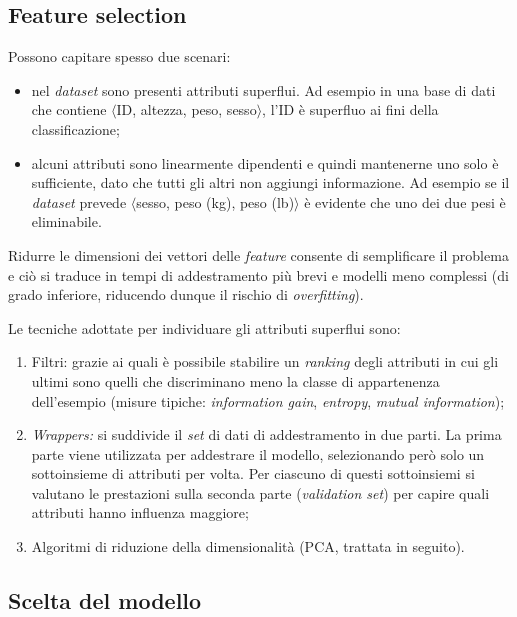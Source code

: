 \subsection{Feature selection}
Possono capitare spesso due scenari:
\begin{itemize}
\item nel \emph{dataset} sono presenti attributi superflui. Ad esempio in una base di dati che contiene $\langle$ID, altezza, peso, sesso$\rangle$, l'ID è superfluo ai fini della classificazione;
\item alcuni attributi sono linearmente dipendenti e quindi mantenerne uno solo è sufficiente, dato che tutti gli altri non aggiungi informazione. Ad esempio se il \emph{dataset} prevede $\langle$sesso, peso (kg), peso (lb)$\rangle$ è evidente che uno dei due pesi è eliminabile.
\end{itemize}

Ridurre le dimensioni dei vettori delle \emph{feature} consente di semplificare il problema e ciò si traduce in tempi di addestramento più brevi e modelli meno complessi (di grado inferiore, riducendo dunque il rischio di \emph{overfitting}).

Le tecniche adottate per individuare gli attributi superflui sono:
\begin{enumerate}
\item Filtri: grazie ai quali è possibile stabilire un \emph{ranking} degli attributi in cui gli ultimi sono quelli che discriminano meno la classe di appartenenza dell'esempio (misure tipiche: \emph{information gain}, \emph{entropy}, \emph{mutual information});
\item \emph{Wrappers:} si suddivide il \emph{set} di dati di addestramento in due parti. La prima parte viene utilizzata per addestrare il modello, selezionando però solo un sottoinsieme di attributi per volta. Per ciascuno di questi sottoinsiemi si valutano le prestazioni sulla seconda parte (\emph{validation set}) per capire quali attributi hanno influenza maggiore;
\item Algoritmi di riduzione della dimensionalità (PCA, trattata in seguito).
\end{enumerate}

\subsection{Scelta del modello}\label{sec:overunderfitting}
